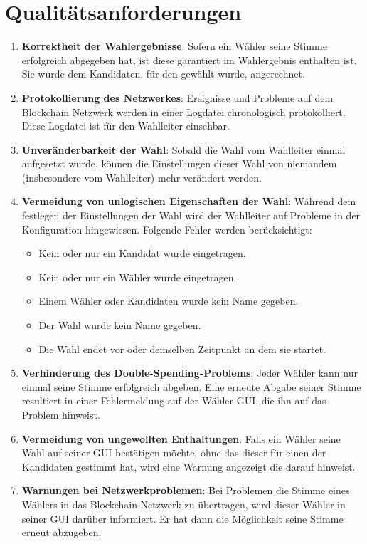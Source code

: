 \documentclass[parskip=full,11pt,twoside]{scrartcl}
\begin{document}
\section{Qualitätsanforderungen}
\begin{enumerate}
	\item \textbf{Korrektheit der Wahlergebnisse}: Sofern ein Wähler seine Stimme erfolgreich abgegeben hat, ist diese garantiert im Wahlergebnis enthalten ist. Sie wurde dem Kandidaten, für den gewählt wurde, angerechnet.
	\item \textbf{Protokollierung des Netzwerkes}: Ereignisse und Probleme auf dem Blockchain Netzwerk werden in einer Logdatei chronologisch protokolliert. Diese Logdatei ist für den Wahlleiter einsehbar.
	\item \textbf{Unveränderbarkeit der Wahl}: Sobald die Wahl vom Wahlleiter einmal aufgesetzt wurde, können die Einstellungen dieser Wahl von niemandem (insbesondere vom Wahlleiter) mehr verändert werden.
	\item \textbf{Vermeidung von unlogischen Eigenschaften der Wahl}: Während dem festlegen der Einstellungen der Wahl wird der Wahlleiter auf Probleme in der Konfiguration hingewiesen. Folgende Fehler werden berücksichtigt:
		\begin{itemize}
			\item Kein oder nur ein Kandidat wurde eingetragen.
			\item Kein oder nur ein Wähler wurde eingetragen.
			\item Einem Wähler oder Kandidaten wurde kein Name gegeben.
			\item Der Wahl wurde kein Name gegeben.
			\item Die Wahl endet vor oder demselben Zeitpunkt an dem sie startet.
		\end{itemize}
	\item \textbf{Verhinderung des Double-Spending-Problems}: Jeder Wähler kann nur einmal seine Stimme erfolgreich abgeben. Eine erneute Abgabe seiner Stimme resultiert in einer Fehlermeldung auf der Wähler GUI, die ihn auf das Problem hinweist.
	\item \textbf{Vermeidung von ungewollten Enthaltungen}: Falls ein Wähler seine Wahl auf seiner GUI bestätigen möchte, ohne das dieser für einen der Kandidaten gestimmt hat, wird eine Warnung angezeigt die darauf hinweist.
	\item \textbf{Warnungen bei Netzwerkproblemen}: Bei Problemen die Stimme eines Wählers in das Blockchain-Netzwerk zu übertragen, wird dieser Wähler in seiner GUI darüber informiert. Er hat dann die Möglichkeit seine Stimme erneut abzugeben. 
\end{enumerate}
\end{document}

